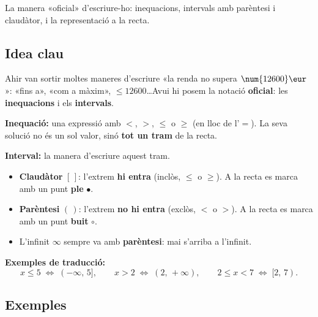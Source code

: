 %
{La manera «oficial» d'escriure-ho: inequacions, intervals amb parèntesi i claudàtor, i la representació a la recta.}

\subsection{Idea clau}

Ahir van sortir moltes maneres d'escriure «la renda no supera $\num{12600}\eur$»:
«fins a», «com a màxim», $\le\num{12600}$\dots Avui hi posem la notació
\textbf{oficial}: les \textbf{inequacions} i els \textbf{intervals}.

\begin{idea}
\textbf{Inequació:} una expressió amb $<$, $>$, $\le$ o $\ge$ (en lloc de l'$=$).
La seva solució no és un sol valor, sinó \textbf{tot un tram} de la recta.

\textbf{Interval:} la manera d'escriure aquest tram.
\begin{itemize}[leftmargin=1.4em, itemsep=2pt]
  \item \textbf{Claudàtor} $[\,]$: l'extrem \textbf{hi entra} (inclòs, $\le$ o $\ge$).
        A la recta es marca amb un punt \textbf{ple} $\bullet$.
  \item \textbf{Parèntesi} $(\,)$: l'extrem \textbf{no hi entra} (exclòs, $<$ o $>$).
        A la recta es marca amb un punt \textbf{buit} $\circ$.
  \item L'infinit $\infty$ sempre va amb \textbf{parèntesi}: mai s'arriba a l'infinit.
\end{itemize}
\textbf{Exemples de traducció:}
\[
x\le 5 \;\Leftrightarrow\; (-\infty,\,5], \qquad
x>2 \;\Leftrightarrow\; (2,\,+\infty), \qquad
2\le x<7 \;\Leftrightarrow\; [2,\,7).
\]
\end{idea}

\subsection{Exemples}

